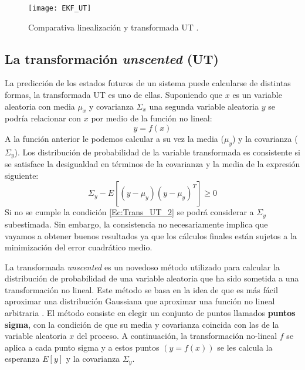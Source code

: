 \begin{figure}[ht!]
\centering
\texttt{[image: EKF\_UT]}
\caption{Comparativa linealización y transformada UT \cite{leonardo_navegacion_2011} \cite{wan_unscented_2000} .} \label{EKF_UKF_UT}
\end{figure}

\subsection{La transformación \textit{unscented} (UT)}

La predicción de los estados futuros de un sistema puede calcularse de distintas formas, la transformada UT es uno de ellas.
Suponiendo que $x$ es un variable aleatoria con media $\mu_{x}$ y covarianza $\Sigma_{x}$ una segunda variable aleatoria $y$ se podría relacionar con $x$ por medio de la función no lineal:
\begin{equation}\label{Ec:Trans_UT_1}
y = f(x)
\end{equation}
A la función anterior le podemos calcular a su vez la media ($\mu_{y}$) y la covarianza ($\Sigma_{y}$).
Los distribución de probabilidad de la variable transformada es consistente si se satisface la desigualdad \cite{_leyton_2009} \cite{julier_unscented_2004} en términos de la covarianza y la media de la expresión siguiente:
\begin{equation}\label{Ec:Trans_UT_2}
\Sigma_{y}- E[(y-\mu_{y})(y-\mu_{y})^{T}] \ge 0
\end{equation}
Si no se cumple la condición \ref{Ec:Trans_UT_2} se podrá considerar a $\Sigma_{y}$ subestimada.
Sin embargo, la consistencia no necesariamente implica que vayamos a obtener buenos resultados ya que los cálculos finales están sujetos a la minimización del error cuadrático medio.

La transformada \textit{unscented} es un novedoso método utilizado para calcular la distribución de probabilidad de una variable aleatoria que ha sido sometida a una transformación no lineal.
Este método se basa en la idea de que es más fácil aproximar una distribución Gaussiana que aproximar una función no lineal arbitraria \cite{julier_new_1995}. 
El método consiste en elegir un conjunto de puntos llamados \textbf{puntos sigma}, con la condición de que su media y covarianza coincida con las de la variable aleatoria $x$ del proceso.
A continuación, la transformación no-lineal $f$ se aplica a cada punto sigma y a estos puntos $(y=f(x))$ se les calcula la esperanza $E[y]$ y la covarianza $\Sigma_{y}$.

